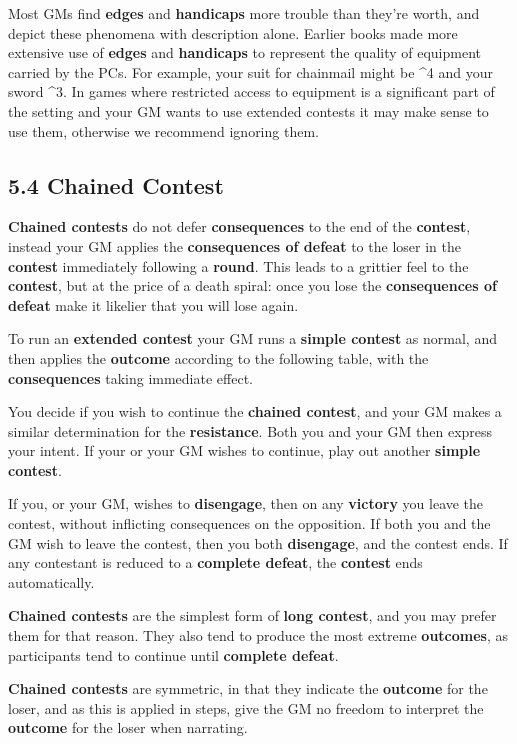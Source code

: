 \documentclass[
]{article}
\begin{document}
Most GMs find \textbf{edges} and \textbf{handicaps} more trouble than
they're worth, and depict these phenomena with description alone.
Earlier books made more extensive use of \textbf{edges} and
\textbf{handicaps} to represent the quality of equipment carried by the
PCs. For example, your suit for chainmail might be \^{}4 and your sword
\^{}3. In games where restricted access to equipment is a significant
part of the setting and your GM wants to use extended contests it may
make sense to use them, otherwise we recommend ignoring them.

\hypertarget{chained-contest}{%
\subsection{5.4 Chained Contest}\label{chained-contest}}

\textbf{Chained contests} do not defer \textbf{consequences} to the end
of the \textbf{contest}, instead your GM applies the
\textbf{consequences of defeat} to the loser in the \textbf{contest}
immediately following a \textbf{round}. This leads to a grittier feel to
the \textbf{contest}, but at the price of a death spiral: once you lose
the \textbf{consequences of defeat} make it likelier that you will lose
again.

To run an \textbf{extended contest} your GM runs a \textbf{simple
contest} as normal, and then applies the \textbf{outcome} according to
the following table, with the \textbf{consequences} taking immediate
effect.

You decide if you wish to continue the \textbf{chained contest}, and
your GM makes a similar determination for the \textbf{resistance}. Both
you and your GM then express your intent. If your or your GM wishes to
continue, play out another \textbf{simple contest}.

If you, or your GM, wishes to \textbf{disengage}, then on any
\textbf{victory} you leave the contest, without inflicting consequences
on the opposition. If both you and the GM wish to leave the contest,
then you both \textbf{disengage}, and the contest ends. If any
contestant is reduced to a \textbf{complete defeat}, the
\textbf{contest} ends automatically.

\textbf{Chained contests} are the simplest form of \textbf{long
contest}, and you may prefer them for that reason. They also tend to
produce the most extreme \textbf{outcomes}, as participants tend to
continue until \textbf{complete defeat}.

\textbf{Chained contests} are symmetric, in that they indicate the
\textbf{outcome} for the loser, and as this is applied in steps, give
the GM no freedom to interpret the \textbf{outcome} for the loser when
narrating.
\end{document}
